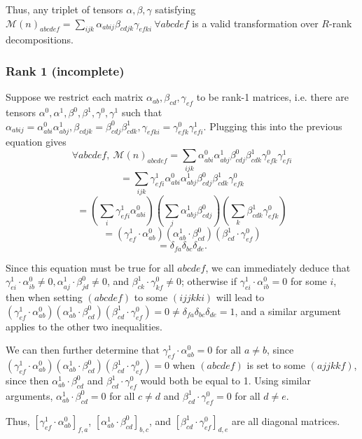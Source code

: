 \documentclass{article}
\begin{document}
Thus, any triplet of tensors $\alpha,\beta,\gamma$ satisfying $\mathcal{M}(n)_{abcdef}=\sum_{ijk}\alpha_{abij}\beta_{cdjk}\gamma_{efki}\ \forall abcdef$ is a valid transformation over $R$-rank decompositions.

\subsubsection{Rank 1 (incomplete)}
Suppose we restrict each matrix $\alpha_{ab},\beta_{cd},\gamma_{ef}$ to be rank-1 matrices, i.e. there are tensors $\alpha^0,\alpha^1,\beta^0,\beta^1,\gamma^0,\gamma^1$ such that $\alpha_{abij}=\alpha^0_{abi}\alpha^1_{abj},\beta_{cdjk}=\beta^0_{cdj}\beta^1_{cdk},\gamma_{efki}=\gamma^0_{efk}\gamma^1_{efi}$. Plugging this into the previous equation gives
\[\forall abcdef,\ \mathcal{M}(n)_{abcdef}=\sum_{ijk}\alpha^0_{abi}\alpha^1_{abj}\beta^0_{cdj}\beta^1_{cdk}\gamma^0_{efk}\gamma^1_{efi}\]
\[=\sum_{ijk}\gamma^1_{efi}\alpha^0_{abi}\alpha^1_{abj}\beta^0_{cdj}\beta^1_{cdk}\gamma^0_{efk}\]
\[=(\sum_i\gamma^1_{efi}\alpha^0_{abi})(\sum_j\alpha^1_{abj}\beta^0_{cdj})(\sum_k\beta^1_{cdk}\gamma^0_{efk})\]
\[=(\gamma^1_{ef}\cdot\alpha^0_{ab})(\alpha^1_{ab}\cdot\beta^0_{cd})(\beta^1_{cd}\cdot\gamma^0_{ef})\]
\[=\delta_{fa}\delta_{bc}\delta_{de}.\]

Since this equation must be true for all $abcdef$, we can immediately deduce that $\gamma^1_{ei}\cdot\alpha^0_{ib}\ne 0,\alpha^1_{aj}\cdot\beta^0_{jd}\ne 0$, and $\beta^1_{ck}\cdot\gamma^0_{kf}\ne 0$; otherwise if $\gamma^1_{ei}\cdot\alpha^0_{ib}=0$ for some $i$, then when setting $(abcdef)$ to some $(ijjkki)$ will lead to $(\gamma^1_{ef}\cdot\alpha^0_{ab})(\alpha^1_{ab}\cdot\beta^0_{cd})(\beta^1_{cd}\cdot\gamma^0_{ef})=0\ne \delta_{fa}\delta_{bc}\delta_{de}=1$, and a similar argument applies to the other two inequalities.

We can then further determine that $\gamma^1_{ef}\cdot\alpha^0_{ab}=0$ for all $a\ne b$, since $(\gamma^1_{ef}\cdot\alpha^0_{ab})(\alpha^1_{ab}\cdot\beta^0_{cd})(\beta^1_{cd}\cdot\gamma^0_{ef})=0$ when $(abcdef)$ is set to some $(ajjkkf)$, since then $\alpha^1_{ab}\cdot\beta^0_{cd}$ and $\beta^1_{cd}\cdot\gamma^0_{ef}$ would both be equal to 1. Using similar arguments, $\alpha^1_{ab}\cdot\beta^0_{cd}=0$ for all $c\ne d$ and $\beta^1_{cd}\cdot\gamma^0_{ef}=0$ for all $d\ne e$.

Thus, $[\gamma^1_{ef}\cdot\alpha^0_{ab}]_{f,a}$, $[\alpha^1_{ab}\cdot\beta^0_{cd}]_{b,c}$, and $[\beta^1_{cd}\cdot\gamma^0_{ef}]_{d,e}$ are all diagonal matrices.
\end{document}
